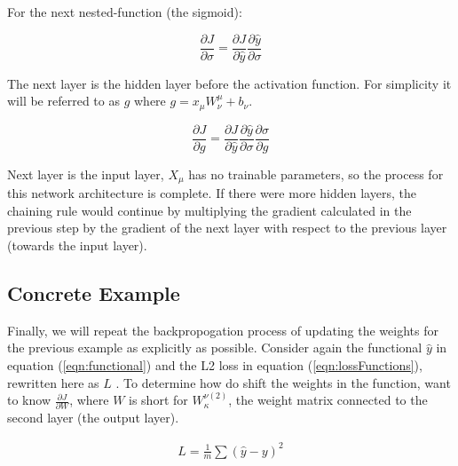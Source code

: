 \noindent For the next nested-function (the sigmoid):

\begin{equation}
\frac{\partial J}{\partial \sigma} = \frac{\partial J}{\partial \hat{y}} \frac{\partial \hat{y}}{\partial \sigma}
\end{equation}


\noindent The next layer is the hidden layer before the activation function. For simplicity it will be referred to as $ g $ where $ g = x_\mu W_\nu ^\mu + b_\nu $.  

\begin{equation}
    \frac{\partial J}{\partial g} = \frac{\partial J}{\partial \hat{y}} \frac{\partial \hat{y}}{\partial \sigma} \frac{\partial \sigma}{\partial g}
\end{equation}


\noindent Next layer is the input layer, $ X_\mu $ has no trainable parameters, so the process for this network architecture is complete. If there were more hidden layers, the chaining rule would continue by multiplying the gradient calculated in the previous step by the gradient of the next layer with respect to the previous layer (towards the input layer). 


\subsection{Concrete Example}

Finally, we will repeat the backpropogation process of updating the weights for the previous example as explicitly as possible. Consider again the functional $ \hat{y} $ in equation (\ref{eqn:functional}) and the L2 loss in equation (\ref{eqn:lossFunctions}), rewritten here as $ L $ . To determine how do shift the weights in the function, want to know $\frac{\partial J}{\partial W}$, where $ W  $ is short for $ W_\kappa ^{\nu (2)} $, the weight matrix connected to the second layer (the output layer). 

\begin{align}
L = \frac{1}{m}\sum(\hat{y} - y)^2 \\
\end{align}


